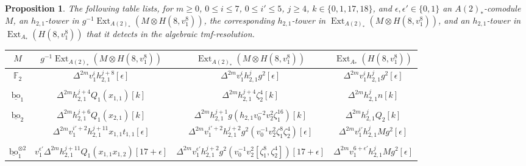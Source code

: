 \documentclass[10pt]{amsart}
\newcommand{\ul}[1]{\underline{#1}}
\newcommand{\FF}{\mathbb{F}}
\newcommand{\bo}{\mathrm{bo}}
\newcommand{\bou}{\ul{\bo}}
\newtheorem{prop}[equation]{Proposition}
\theoremstyle{definition}
\numberwithin{equation}{section}
\numberwithin{figure}{section}
\DeclareMathOperator{\Ext}{Ext}
\begin{document}
\begin{prop}\label{prop:h21detectionH38}
The following table lists, for $m \ge 0$, $0 \le i \le 7$, $0 \le i' \le 5$, $j \ge 4$, $k \in \{0,1,17,18\}$, and $\epsilon, \epsilon' \in \{0,1\}$ an $A(2)_*$-comodule $M$, an $h_{2,1}$-tower in $g^{-1}\Ext_{A(2)_*}(M \otimes H(8,v_1^8))$, the corresponding $h_{2,1}$-tower in $\Ext_{A(2)_*}(M \otimes H(8,v_1^8))$, and an $h_{2,1}$-tower in $\Ext_{A_*}(H(8,v_1^8))$ that it detects in the algebraic tmf-resolution. 
\begin{center}
{\scriptsize \begin{tabular}{c|c|c|c}
$M$ & $g^{-1}\Ext_{A(2)_*}(M \otimes H(8,v_1^8))$ & $\Ext_{A(2)_*}(M \otimes H(8,v_1^8))$ & $\Ext_{A_*}(H(8,v_1^8))$ \\
\hline
$\FF_2$ & $\Delta^{2m}v_1^i h^{j+8}_{2,1}[\epsilon]$ & 
$\Delta^{2m}v_1^i h^{j}_{2,1} g^2[\epsilon]$ &$\Delta^{2m}v_1^i h_{2,1}^{j} g^2[\epsilon]$ \\
&&&\\
$\bou_1$ & $\Delta^{2m}h^{j+4}_{2,1} Q_1(x_{1,1})[k]$ & $\Delta^{2m}h_{2,1}^{j+4}\zeta_2^4[k]$ & $\Delta^{2m}h_{2,1}^{j} n[k]$ \\
&&&\\
$\bou_2$ & $\Delta^{2m}h_{2,1}^{j+6} Q_1(x_{2,1})[k]$ & $\Delta^{2m}h^{j+1}_{2,1} g(h_{2,1}v_0^{-2}v_2^2\zeta_1^{16})[k]$ & $\Delta^{2m}h_{2,1}^{j} Q_2[k]$ \\
 & $\Delta^{2m}v_1^{i'+2} h_{2,1}^{j+11}x_{1,1}t_{1,1}[\epsilon]$ & $\Delta^{2m}v_1^{i'+2}h^{j+2}_{2,1}g^2(v_0^{-1}v_2^2\zeta_1^8\zeta_2^4)[\epsilon]$ & $\Delta^{2m}v_1^{i'} h_{2,1}^{j} Mg^2[\epsilon]$ \\
&&&\\
$\bou_1^{\otimes 2}$ & $v_1^{\epsilon'} \Delta^{2m}h_{2,1}^{j+11}Q_1(x_{1,1}x_{1,2})[17+\epsilon]$ & $\Delta^{2m}v_1^{\epsilon'}h^{j+2}_{2,1}g^2(v_0^{-1}v_2^2[\zeta_1^8,\zeta_2^4])[17+\epsilon]$ & $\Delta^{2m}v_1^{6+\epsilon'} h_{2,1}^{j} Mg^2[\epsilon]$ \\
\hline
\end{tabular} }
\end{center}
\end{prop}
\end{document}
